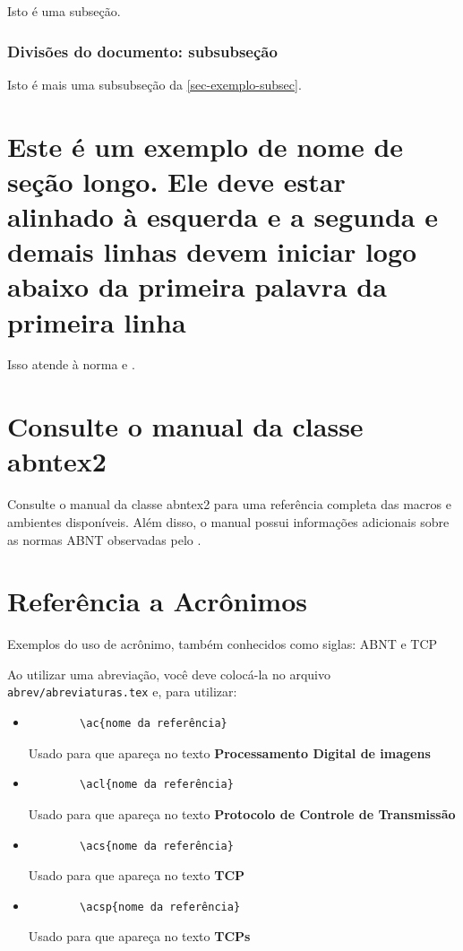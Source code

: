 Isto é uma subseção.

\subsubsection{Divisões do documento: subsubseção}

Isto é mais uma subsubseção da \autoref{sec-exemplo-subsec}.

\section{Este é um exemplo de nome de seção longo. Ele deve estar
alinhado à esquerda e a segunda e demais linhas devem iniciar logo abaixo da
primeira palavra da primeira linha}

Isso atende à norma  
 e .


\section{Consulte o manual da classe \textsf{abntex2}}

Consulte o manual da classe \textsf{abntex2} \cite{abntex2classe} para uma
referência completa das macros e ambientes disponíveis. Além disso, o manual
possui informações adicionais sobre as normas ABNT observadas pelo \abnTeX.

\section{Referência a Acrônimos}

Exemplos do uso de acrônimo, também conhecidos como siglas: \ac{ABNT} e \ac{TCP}

Ao utilizar uma abreviação, você deve colocá-la no arquivo \texttt{abrev/abreviaturas.tex} e, para utilizar:

\begin{itemize}
	\item \begin{verbatim}
		\ac{nome da referência} 
	\end{verbatim}
	Usado para que apareça no texto \textbf{Processamento Digital de imagens}
	\item \begin{verbatim}
		\acl{nome da referência}  
	\end{verbatim}
	Usado para que apareça no texto \textbf{Protocolo de Controle de Transmissão}
	\item \begin{verbatim}
		\acs{nome da referência}  
	\end{verbatim}
	Usado para que apareça no texto \textbf{TCP}
	\item \begin{verbatim}
		\acsp{nome da referência}  
	\end{verbatim}
	Usado para que apareça no texto \textbf{TCPs}
\end{itemize}
